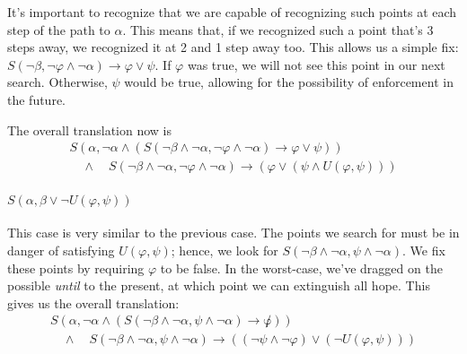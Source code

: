 \documentclass[a4paper,UKenglish,cleveref, autoref, thm-restate, numberwithinsect]{lipics-v2021}
\begin{document}
It's important to recognize that we are capable of recognizing such points at each step of the path to $\alpha$. This means that, if we recognized such a point that's 3 steps away, we recognized it at 2 and 1 step away too. This allows us a simple fix: $S(\lnot \beta, \lnot \varphi \land \lnot \alpha) \to \varphi \lor \psi$. If $\varphi$ was true, we will not see this point in our next search. Otherwise, $\psi$ would be true, allowing for the possibility of enforcement in the future.

The overall translation now is
\begin{equation*}
    \begin{aligned}
    S(\alpha, \lnot \alpha \land (S(\lnot \beta \land \lnot \alpha, \lnot \varphi \land \lnot \alpha) \to \varphi \lor \psi)) \\
    \quad \land \quad S(\lnot \beta \land \lnot \alpha, \lnot \varphi \land \lnot \alpha) \to (\varphi \lor (\psi \land U(\varphi, \psi)))
    \end{aligned}
\end{equation*}

\paragraph*{$S(\alpha, \beta \lor \lnot U(\varphi, \psi))$}
This case is very similar to the previous case. The points we search for must be in danger of satisfying $U(\varphi, \psi)$; hence, we look for $S(\lnot \beta \land \lnot \alpha, \psi \land \lnot \alpha)$. We fix these points by requiring $\varphi$ to be false. In the worst-case, we've dragged on the possible \textit{until} to the present, at which point we can extinguish all hope. This gives us the overall translation:
\begin{equation*}
    \begin{aligned}
    S(\alpha, \lnot \alpha \land (S(\lnot \beta \land \lnot \alpha, \psi \land \lnot \alpha) \to \not \varphi)) \\
    \quad \land \quad S(\lnot \beta \land \lnot \alpha, \psi \land \lnot \alpha) \to ((\lnot \psi \land \lnot \varphi) \lor (\lnot U(\varphi, \psi)))
    \end{aligned}
\end{equation*}
\end{document}
